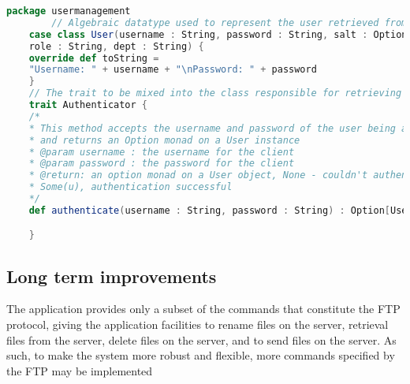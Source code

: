 \begin{lstlisting}[language=Scala, caption=Database of users, tabsize=2]
	package usermanagement
		// Algebraic datatype used to represent the user retrieved from the database
	case class User(username : String, password : String, salt : Option[String],
	role : String, dept : String) {
	override def toString =
	"Username: " + username + "\nPassword: " + password
	}
	// The trait to be mixed into the class responsible for retrieving user information
	trait Authenticator {
	/*
	* This method accepts the username and password of the user being added
	* and returns an Option monad on a User instance
	* @param username : the username for the client
	* @param password : the password for the client
	* @return: an option monad on a User object, None - couldn't authenticate,
	* Some(u), authentication successful
	*/
	def authenticate(username : String, password : String) : Option[User]

	}
\end{lstlisting}


\subsection{Long term improvements}
The application provides only a subset of the commands that constitute the FTP protocol, giving the application facilities to rename files on the server, retrieval files from the server, delete files on the server, and to send files on the server. As such, to make the system more robust and flexible, more commands specified by the FTP may be implemented
